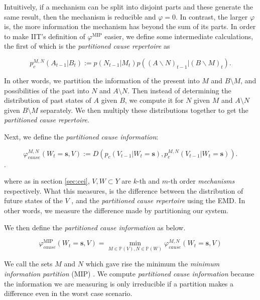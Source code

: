 Intuitively, if a mechanism can be split into disjoint parts and these generate the same result, then the mechanism is reducible and $\varphi=0$. In contrast, the larger $\varphi$ is, the more information the mechanism has beyond the sum of its parts. In order to make IIT's definition of $\varphi^{\text{MIP}}$ easier, we define some intermediate calculations, the first of which is the \textit{partitioned cause repertoire} as

\begin{equation}
\label{def:preMIP}
p_c^{M,N}(A_{t-1}|B_t ):= p(N_{t-1}|M_t) p((A \backslash N)_{t-1} |(B \backslash M)_t).
\end{equation}

In other words, we partition the information of the present into $M$ and $B\setminus M$, and possibilities of the past into $N$ and $A \setminus N$. Then instead of determining the distribution of past states of $A$ given $B$, we compute it for $N$ given $M$ and $A\setminus N$ given $B \setminus M$ separately. We then multiply these distributions together to get the \textit{partitioned cause repertoire}.

Next, we define the \textit{partitioned cause information}:

\begin{equation}
\label{def:phi2}
\varphi_{cause}^{M,N}(W_t=\mathbf{s}, V) := D \left( p_c(V_{t-1}|W_t=\mathbf{s}) ,p^{M,N}_c(V_{t-1}|W_{t} = \mathbf{s})  \right).
\end{equation}.

where as in section \ref{sec:cei}, $V, W \subset Y$ are $k$-th and $m$-th order \textit{mechanisms} respectively. What this measures, is the difference between the distribution of future states of the $V$ , and the \textit{partitioned cause repertoire} using the EMD. In other words, we measure the difference made by partitioning our system.

We then define the \textit{partitioned cause information} as below.

\begin{equation}
\label{def:phi3}
\varphi_{cause}^{\text{MIP}}(W_t=\mathbf{s}, V)  =\min \limits_{M \in \mathbb{P}(V), N \in \mathbb{P}(W)} \varphi_{cause}^{M,N}(W_t=\mathbf{s}, V) 
\end{equation}

We call the sets $M$ and $N$ which gave rise the minimum the \textit{minimum information partition} (MIP) \cite{oizumi2014phenomenology}. We compute \textit{partitioned cause information} because the information we are measuring is only irreducible if a partition makes a difference even in the worst case scenario.


